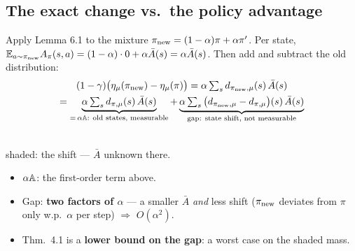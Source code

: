 \subsection{The exact change vs.\ the policy advantage}

Apply Lemma 6.1 to the mixture $\pi_{\mathrm{new}}=(1-\alpha)\pi+\alpha\pi'$. Per state,
$\mathbb{E}_{a\sim\pi_{\mathrm{new}}}A_\pi(s,a)=(1-\alpha)\cdot0+\alpha\bar A(s)=\alpha\bar A(s)$. Then add and subtract the old distribution:
\begin{gather*}
  (1-\gamma)\big(\eta_\mu(\pi_{\mathrm{new}})-\eta_\mu(\pi)\big) = \alpha\textstyle\sum_s d_{\pi_{\mathrm{new}},\mu}(s)\,\bar A(s) \\
  = \underbrace{\alpha\textstyle\sum_s d_{\pi,\mu}(s)\,\bar A(s)}_{=\,\alpha\mathbb{A}:\ \text{old states, measurable}}
    + \underbrace{\alpha\textstyle\sum_s \big(d_{\pi_{\mathrm{new}},\mu}-d_{\pi,\mu}\big)(s)\,\bar A(s)}_{\text{gap: state shift, not measurable}}
\end{gather*}

\begin{minipage}[c]{0.45\linewidth}
\centering
{}\\
{\scriptsize \textcolor{BadRed}{shaded}: the shift --- $\bar A$ unknown there.}
\end{minipage}\hfill
\begin{minipage}[c]{0.52\linewidth}
\begin{itemize}
  \item $\alpha\mathbb{A}$: the first-order term above.
  \item Gap: \textbf{two factors of $\alpha$} --- a smaller $\bar A$ \emph{and} less shift ($\pi_{\mathrm{new}}$ deviates from $\pi$ only w.p.\ $\alpha$ per step) $\Rightarrow$ $O(\alpha^2)$.
  \item Thm.~4.1 is a \textbf{lower bound on the gap}: a worst case on the shaded mass.
\end{itemize}
\end{minipage}

